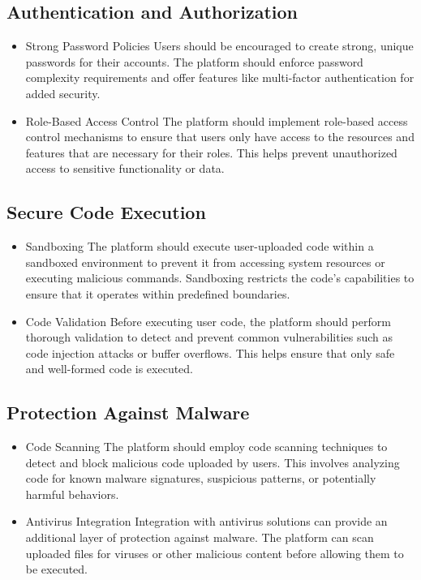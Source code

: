 \subsection{Authentication and Authorization}

\begin{itemize}
    \item{Strong Password Policies}
    Users should be encouraged to create strong, unique passwords for their accounts. The 	platform should enforce password complexity requirements and offer features like multi-factor authentication for added security.
    
    \item{Role-Based Access Control}
    The platform should implement role-based access control mechanisms to ensure that users only have access to the resources and features that are necessary for their roles. This helps prevent unauthorized access to sensitive functionality or data.
    
\end{itemize}

\subsection{Secure Code Execution}

\begin{itemize}
    \item {Sandboxing}
    The platform should execute user-uploaded code within a sandboxed environment to prevent it from accessing system resources or executing malicious commands. Sandboxing restricts the code's capabilities to ensure that it operates within predefined boundaries.
    \item {Code Validation}
    Before executing user code, the platform should perform thorough validation to detect and prevent common vulnerabilities such as code injection attacks or buffer overflows. This helps ensure that only safe and well-formed code is executed.
\end{itemize}

\subsection{Protection Against Malware}

\begin{itemize}
    \item {Code Scanning}
    The platform should employ code scanning techniques to detect and block malicious code uploaded by users. This involves analyzing code for known malware signatures, suspicious patterns, or potentially harmful behaviors.
    \item {Antivirus Integration}
    Integration with antivirus solutions can provide an additional layer of protection against malware. The platform can scan uploaded files for viruses or other malicious content before allowing them to be executed.
\end{itemize}


